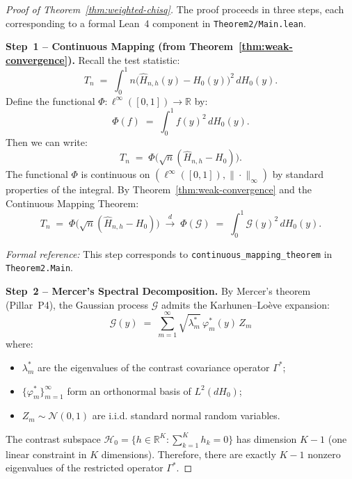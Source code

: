 \begin{proof}[Proof of Theorem~\ref{thm:weighted-chisq}]
The proof proceeds in three steps, each corresponding to a formal Lean~4 component in \texttt{Theorem2/Main.lean}.

\textbf{Step~1 -- Continuous Mapping (from Theorem~\ref{thm:weak-convergence}).}
Recall the test statistic:
\[
T_n \;=\; \int_0^1 n\big(\widehat{H}_{n,h}(y) - H_0(y)\big)^2 \, dH_0(y).
\]
Define the functional $\Phi: \ell^{\infty}([0,1]) \to \mathbb{R}$ by:
\begin{equation}\label{eq:Phi-functional}
\Phi(f) \;=\; \int_0^1 f(y)^2 \, dH_0(y).
\end{equation}
Then we can write:
\[
T_n \;=\; \Phi\big(\sqrt{n}(\widehat{H}_{n,h} - H_0)\big).
\]
The functional $\Phi$ is continuous on $(\ell^{\infty}([0,1]), \|\cdot\|_{\infty})$ by standard properties of the integral. By Theorem~\ref{thm:weak-convergence} and the Continuous Mapping Theorem:
\begin{equation}
T_n \;=\; \Phi\big(\sqrt{n}(\widehat{H}_{n,h} - H_0)\big) \;\xrightarrow{d}\; \Phi(\mathcal{G}) \;=\; \int_0^1 \mathcal{G}(y)^2 \, dH_0(y).
\end{equation}

\textit{Formal reference:} This step corresponds to \texttt{continuous\_mapping\_theorem} in \texttt{Theorem2.Main}.

\textbf{Step~2 -- Mercer's Spectral Decomposition.}
By Mercer's theorem (Pillar~P4), the Gaussian process $\mathcal{G}$ admits the Karhunen--Lo\`{e}ve expansion:
\begin{equation}\label{eq:kl-expansion}
\mathcal{G}(y) \;=\; \sum_{m=1}^{\infty} \sqrt{\lambda_m^*} \, \varphi_m^*(y) \, Z_m
\end{equation}
where:
\begin{itemize}
\item $\lambda_m^*$ are the eigenvalues of the contrast covariance operator $\Gamma^*$;
\item $\{\varphi_m^*\}_{m=1}^{\infty}$ form an orthonormal basis of $L^2(dH_0)$;
\item $Z_m \sim \mathcal{N}(0,1)$ are i.i.d. standard normal random variables.
\end{itemize}

The contrast subspace $\mathcal{H}_0 = \{h \in \mathbb{R}^K : \sum_{k=1}^K h_k = 0\}$ has dimension $K-1$ (one linear constraint in $K$ dimensions). Therefore, there are exactly $K-1$ nonzero eigenvalues of the restricted operator $\Gamma^*$.


\end{proof}

